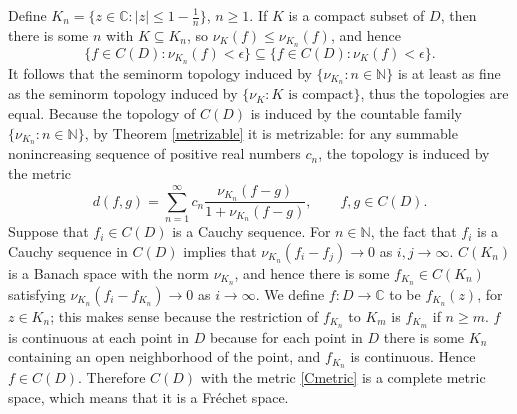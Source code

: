 \documentclass{article}
\begin{document}
Define $K_n=\{z \in \mathbb{C}: |z| \leq 1-\frac{1}{n}\}$, $n \geq 1$. If $K$ is a compact subset of $D$, then there is some $n$ with $K \subseteq K_n$,
so $\nu_K(f) \leq \nu_{K_n}(f)$, and hence
\[
\{f \in C(D): \nu_{K_n}(f)<\epsilon\} \subseteq \{f \in C(D): \nu_K(f) < \epsilon\}. 
\]
It follows that the seminorm topology induced by $\{\nu_{K_n}:n \in \mathbb{N}\}$ is at least as fine as the seminorm topology
induced by $\{\nu_K: \textrm{$K$ is compact}\}$, thus the topologies are equal. 
Because the topology of $C(D)$ is induced by the countable family $\{\nu_{K_n}: n \in \mathbb{N} \}$,  by Theorem \ref{metrizable} it is metrizable:  for any summable nonincreasing sequence of positive real numbers $c_n$, the topology is induced by the metric
\begin{equation}
d(f,g) = \sum_{n=1}^\infty c_n \frac{\nu_{K_n}(f-g)}{1+\nu_{K_n}(f-g)}, \qquad f,g \in C(D).
\label{Cmetric}
\end{equation}
Suppose that $f_i \in C(D)$ is a Cauchy sequence. For $n \in \mathbb{N}$,  the fact that $f_i$ is a Cauchy sequence in $C(D)$ implies that
$\nu_{K_n}(f_i-f_j) \to 0$ as $i,j \to \infty$. $C(K_n)$ is a Banach space with the norm $\nu_{K_n}$, and hence there is some $f_{K_n} \in C(K_n)$ satisfying
$\nu_{K_n}(f_i-f_{K_n}) \to 0$ as $i \to \infty$. We define $f:D \to \mathbb{C}$ to be $f_{K_n}(z)$, for $z \in K_n$; this makes sense because the restriction of
$f_{K_n}$ to $K_m$ is $f_{K_m}$ if $n \geq m$. 
$f$ is continuous at each point in $D$ because for each point in $D$ there is some $K_n$ containing an open neighborhood of the point, and $f_{K_n}$ is continuous.
Hence $f \in C(D)$. Therefore $C(D)$ with the metric \eqref{Cmetric} is a complete metric space, which means that it is a Fr\'echet space.
\end{document}
